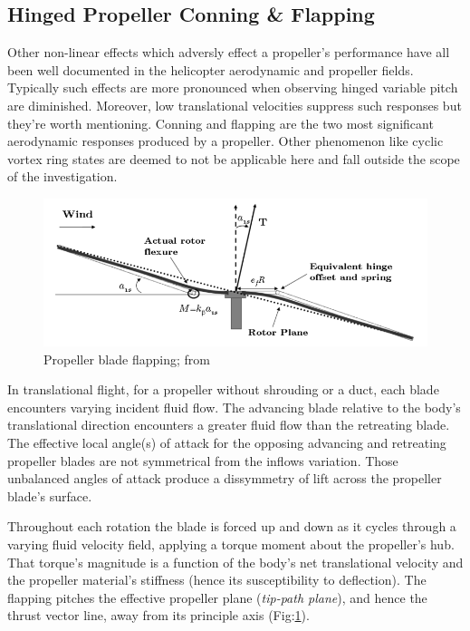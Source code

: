 \subsection{Hinged Propeller Conning \& Flapping}
\label{subsec:dynamics.aero.flap}
Other non-linear effects which adversly effect a propeller's performance have all been well documented in the helicopter aerodynamic and propeller fields\cite{basichelicopter,bramwell}. Typically such effects are more pronounced when observing hinged variable pitch are diminished. Moreover, low translational velocities suppress such responses but they're worth mentioning. Conning and flapping are the two most significant aerodynamic responses produced by a propeller. Other phenomenon like cyclic vortex ring states are deemed to not be applicable here and fall outside the scope of the investigation. 
\par
\begin{figure}[htbp]
\centering
\includegraphics[width=\textwidth]{figs/prop-flap}
\caption{Propeller blade flapping; from \cite{starmac}}
\label{fig:prop-flap}
\end{figure}
In translational flight, for a propeller without shrouding or a duct, each blade encounters varying incident fluid flow. The advancing blade relative to the body's translational direction encounters a greater fluid flow than the retreating blade. The effective local angle(s) of attack for the opposing advancing and retreating propeller blades are not symmetrical from the inflows variation. Those unbalanced angles of attack produce a dissymmetry of lift across the propeller blade's surface.
\par
Throughout each rotation the blade is forced up and down as it cycles through a varying fluid velocity field, applying a torque moment about the propeller's hub. That torque's magnitude is a function of the body's net translational velocity and the propeller material's stiffness (hence its susceptibility to deflection). The flapping pitches the effective propeller plane (\emph{tip-path plane}), and hence the thrust vector line, away from its principle axis (Fig:\ref{fig:prop-flap}).
